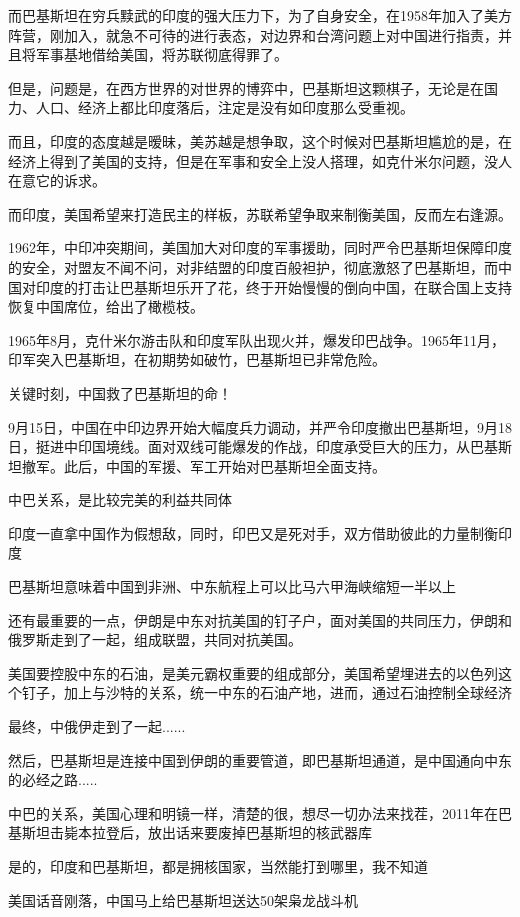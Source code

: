 \documentclass[UTF8, 11pt, oneside]{ctexart}
\begin{document}
而巴基斯坦在穷兵黩武的印度的强大压力下，为了自身安全，在1958年加入了美方阵营，刚加入，就急不可待的进行表态，对边界和台湾问题上对中国进行指责，并且将军事基地借给美国，将苏联彻底得罪了。

但是，问题是，在西方世界的对世界的博弈中，巴基斯坦这颗棋子，无论是在国力、人口、经济上都比印度落后，注定是没有如印度那么受重视。

而且，印度的态度越是暧昧，美苏越是想争取，这个时候对巴基斯坦尴尬的是，在经济上得到了美国的支持，但是在军事和安全上没人搭理，如克什米尔问题，没人在意它的诉求。

而印度，美国希望来打造民主的样板，苏联希望争取来制衡美国，反而左右逢源。

1962年，中印冲突期间，美国加大对印度的军事援助，同时严令巴基斯坦保障印度的安全，对盟友不闻不问，对非结盟的印度百般袒护，彻底激怒了巴基斯坦，而中国对印度的打击让巴基斯坦乐开了花，终于开始慢慢的倒向中国，在联合国上支持恢复中国席位，给出了橄榄枝。

1965年8月，克什米尔游击队和印度军队出现火并，爆发印巴战争。1965年11月，印军突入巴基斯坦，在初期势如破竹，巴基斯坦已非常危险。

关键时刻，中国救了巴基斯坦的命！

9月15日，中国在中印边界开始大幅度兵力调动，并严令印度撤出巴基斯坦，9月18日，挺进中印国境线。面对双线可能爆发的作战，印度承受巨大的压力，从巴基斯坦撤军。此后，中国的军援、军工开始对巴基斯坦全面支持。

中巴关系，是比较完美的利益共同体

印度一直拿中国作为假想敌，同时，印巴又是死对手，双方借助彼此的力量制衡印度

巴基斯坦意味着中国到非洲、中东航程上可以比马六甲海峡缩短一半以上

还有最重要的一点，伊朗是中东对抗美国的钉子户，面对美国的共同压力，伊朗和俄罗斯走到了一起，组成联盟，共同对抗美国。

美国要控股中东的石油，是美元霸权重要的组成部分，美国希望埋进去的以色列这个钉子，加上与沙特的关系，统一中东的石油产地，进而，通过石油控制全球经济

最终，中俄伊走到了一起......

然后，巴基斯坦是连接中国到伊朗的重要管道，即巴基斯坦通道，是中国通向中东的必经之路.....

中巴的关系，美国心理和明镜一样，清楚的很，想尽一切办法来找茬，2011年在巴基斯坦击毙本拉登后，放出话来要废掉巴基斯坦的核武器库

是的，印度和巴基斯坦，都是拥核国家，当然能打到哪里，我不知道

美国话音刚落，中国马上给巴基斯坦送达50架枭龙战斗机
\end{document}
